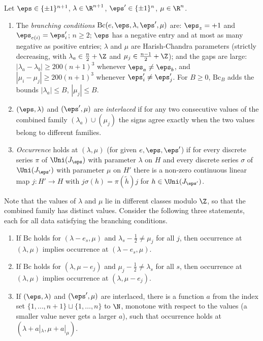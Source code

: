 \begin{definition}\label{pf:fs:gp}
Let $\eps\in\{\pm1\}^{n+1}$, $\lambda\in\R^{n+1}$, $\eps'\in\{\pm1\}^n$, $\mu\in\R^n$.
\begin{enumerate}[label=(\alph*)]
\item The \emph{branching conditions} $\mathrm{Bc}(e,\eps,\lambda,\eps',\mu)$ are: $\eps_z=+1$ and $\eps_{e(i)}=\eps'_i$; $n\ge2$; $\eps$ has a negative
entry and at most as many negative as positive entries; $\lambda$ and $\mu$ are Harish-Chandra parameters (strictly decreasing, with
$\lambda_a\in\frac n2+\Z$ and $\mu_j\in\frac{n-1}2+\Z$); and the gaps are large: $|\lambda_a-\lambda_b|\ge200(n+1)^3$ whenever $\eps_a\ne\eps_b$, and
$|\mu_i-\mu_j|\ge200(n+1)^3$ whenever $\eps'_i\ne\eps'_j$. For $B\ge0$, $\mathrm{Bc}_B$ adds the bounds $|\lambda_a|\le B$, $|\mu_j|\le B$.
\item $(\eps,\lambda)$ and $(\eps',\mu)$ are \emph{interlaced} if for any two consecutive values of the combined family $(\lambda_a)\cup(\mu_j)$
the signs agree exactly when the two values belong to different families.
\item \emph{Occurrence} holds at $(\lambda,\mu)$ (for given $e,\eps,\eps'$) if for every discrete series $\pi$ of $\Uni(J_\eps)$ with parameter
$\lambda$ on $H$ and every discrete series $\sigma$ of $\Uni(J_{\eps'})$ with parameter $\mu$ on $H'$ there is a non-zero continuous linear map
$j\colon H'\to H$ with $j\sigma(h)=\pi(\tilde h)j$ for $h\in\Uni(J_{\eps'})$.
\end{enumerate}
\end{definition}

Note that the values of $\lambda$ and $\mu$ lie in different classes modulo $\Z$, so that the combined family has distinct values. Consider the
following three statements, each for all data satisfying the branching conditions.
\begin{enumerate}
\item[(L)] If $\mathrm{Bc}$ holds for $(\lambda-e_s,\mu)$ and $\lambda_s-\frac12\ne\mu_j$ for all $j$, then occurrence at $(\lambda,\mu)$ implies
occurrence at $(\lambda-e_s,\mu)$.
\item[(M)] If $\mathrm{Bc}$ holds for $(\lambda,\mu-e_j)$ and $\mu_j-\frac12\ne\lambda_s$ for all $s$, then occurrence at $(\lambda,\mu)$ implies
occurrence at $(\lambda,\mu-e_j)$.
\item[(B)] If $(\eps,\lambda)$ and $(\eps',\mu)$ are interlaced, there is a function $a$ from the index set
$\{1,\dots,n+1\}\sqcup\{1,\dots,n\}$ to $\N$, monotone with respect to the values (a smaller value never gets a larger $a$), such that
occurrence holds at $(\lambda+a|_\lambda,\mu+a|_\mu)$.
\end{enumerate}

